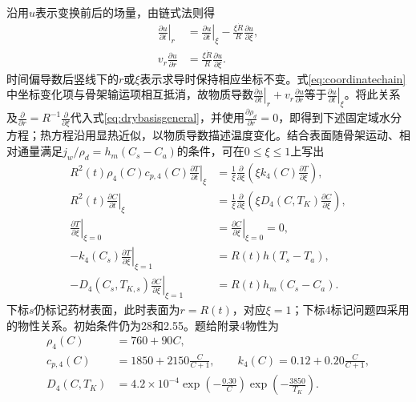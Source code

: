 沿用$u$表示变换前后的场量，由链式法则得
\begin{equation}
\begin{aligned}
\left.\frac{\partial u}{\partial t}\right|_r
&=\left.\frac{\partial u}{\partial t}\right|_\xi
-\frac{\xi\dot R}{R}\frac{\partial u}{\partial\xi},\\
v_r\frac{\partial u}{\partial r}
&=\frac{\xi\dot R}{R}\frac{\partial u}{\partial\xi}.
\end{aligned}
\label{eq:coordinatechain}
\end{equation}
时间偏导数后竖线下的$r$或$\xi$表示求导时保持相应坐标不变。式\eqref{eq:coordinatechain}中坐标变化项与骨架输运项相互抵消，故物质导数$\left.\frac{\partial u}{\partial t}\right|_r+v_r\frac{\partial u}{\partial r}$等于$\left.\frac{\partial u}{\partial t}\right|_\xi$。将此关系及$\frac{\partial}{\partial r}=R^{-1}\frac{\partial}{\partial\xi}$代入式\eqref{eq:drybasisgeneral}，并使用$\frac{\partial\rho_d}{\partial r}=0$，即得到下述固定域水分方程；热方程沿用显热近似，以物质导数描述温度变化。结合表面随骨架运动、相对通量满足$j_w/\rho_d=h_m(C_s-C_a)$的条件，可在$0\le\xi\le1$上写出
\begin{align}
R^2(t)\rho_4(C)c_{p,4}(C)\left.\frac{\partial T}{\partial t}\right|_\xi
&=\frac1\xi\frac{\partial}{\partial\xi}\left(\xi k_4(C)\frac{\partial T}{\partial\xi}\right),\label{eq:movingT}\\
R^2(t)\left.\frac{\partial C}{\partial t}\right|_\xi
&=\frac1\xi\frac{\partial}{\partial\xi}\left(\xi D_4(C,T_K)\frac{\partial C}{\partial\xi}\right),\label{eq:movingC}\\
\left.\frac{\partial T}{\partial\xi}\right|_{\xi=0}&=\left.\frac{\partial C}{\partial\xi}\right|_{\xi=0}=0,\\
-k_4(C_s)\left.\frac{\partial T}{\partial\xi}\right|_{\xi=1}&=R(t)h(T_s-T_a),\\
-D_4(C_s,T_{K,s})\left.\frac{\partial C}{\partial\xi}\right|_{\xi=1}&=R(t)h_m(C_s-C_a).
\end{align}
下标$s$仍标记药材表面，此时表面为$r=R(t)$，对应$\xi=1$；下标4标记问题四采用的物性关系。初始条件仍为28\tempunit 和2.55\cunit。题给附录4物性为
\begin{align}
\rho_4(C)&=760+90C,\\
c_{p,4}(C)&=1850+2150\frac{C}{C+1},\qquad
k_4(C)=0.12+0.20\frac{C}{C+1},\\
D_4(C,T_K)&=4.2\times10^{-4}\exp\left(-\frac{0.30}{C}\right)
\exp\left(-\frac{3850}{T_K}\right).
\label{eq:p4prop}
\end{align}

